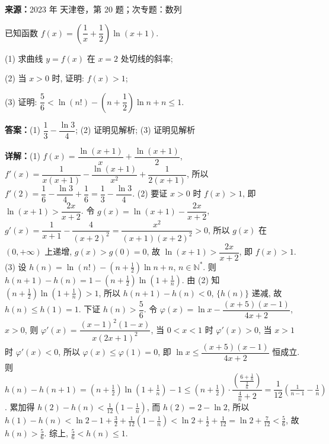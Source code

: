 \begin{question}[points=16]
\textbf{来源：}2023 年 天津卷，第 20 题；次专题：数列\par
已知函数 $f(x) = \left(\dfrac{1}{x} + \dfrac{1}{2}\right)\ln(x+1)$.

(1) 求曲线 $y = f(x)$ 在 $x = 2$ 处切线的斜率;

(2) 当 $x > 0$ 时, 证明: $f(x) > 1$;

(3) 证明: $\dfrac{5}{6} < \ln(n!) - \left(n+\dfrac{1}{2}\right)\ln n + n \le 1$.
\begin{solution}
\textbf{答案：}(1) $\dfrac{1}{3} - \dfrac{\ln 3}{4}$; (2) 证明见解析; (3) 证明见解析

\textbf{详解：}(1) $f(x) = \dfrac{\ln(x+1)}{x} + \dfrac{\ln(x+1)}{2}$, $f'(x) = \dfrac{1}{x(x+1)} - \dfrac{\ln(x+1)}{x^2} + \dfrac{1}{2(x+1)}$, 所以 $f'(2) = \dfrac{1}{6} - \dfrac{\ln3}{4} + \dfrac{1}{6} = \dfrac{1}{3} - \dfrac{\ln3}{4}$.
(2) 要证 $x>0$ 时 $f(x) > 1$, 即 $\ln(x+1) > \dfrac{2x}{x+2}$. 令 $g(x) = \ln(x+1) - \dfrac{2x}{x+2}$, $g'(x) = \dfrac{1}{x+1} - \dfrac{4}{(x+2)^2} = \dfrac{x^2}{(x+1)(x+2)^2} > 0$, 所以 $g(x)$ 在 $(0,+\infty)$ 上递增, $g(x) > g(0) = 0$, 故 $\ln(x+1) > \dfrac{2x}{x+2}$, 即 $f(x) > 1$.
(3) 设 $h(n) = \ln(n!) - \left(n+\frac{1}{2}\right)\ln n + n$, $n \in \mathbb{N}^*$. 则 $h(n+1)-h(n) = 1 - \left(n+\frac{1}{2}\right)\ln\left(1+\frac{1}{n}\right)$. 由 (2) 知 $\left(n+\frac{1}{2}\right)\ln\left(1+\frac{1}{n}\right) > 1$, 所以 $h(n+1)-h(n) < 0$, $\{h(n)\}$ 递减, 故 $h(n) \le h(1) = 1$. 下证 $h(n) > \dfrac{5}{6}$. 令 $\varphi(x) = \ln x - \dfrac{(x+5)(x-1)}{4x+2}$, $x>0$, 则 $\varphi'(x) = \dfrac{(x-1)^2(1-x)}{x(2x+1)^2}$, 当 $0<x<1$ 时 $\varphi'(x)>0$, 当 $x>1$ 时 $\varphi'(x)<0$, 所以 $\varphi(x) \le \varphi(1)=0$, 即 $\ln x \le \dfrac{(x+5)(x-1)}{4x+2}$ 恒成立. 则 $h(n)-h(n+1) = \left(n+\frac{1}{2}\right)\ln\left(1+\frac{1}{n}\right) - 1 \le \left(n+\frac{1}{2}\right) \cdot \dfrac{\left(\frac{6+\frac{1}{n}}{\frac{2}{n}}\right)}{\frac{4}{n}+2} = \dfrac{1}{12}\left(\frac{1}{n-1} - \frac{1}{n}\right)$. 累加得 $h(2)-h(n) < \frac{1}{12}\left(1-\frac{1}{n}\right)$, 而 $h(2) = 2-\ln2$, 所以 $h(1)-h(n) < \ln2 - 1 + \frac{3}{2} + \frac{1}{12}\left(1-\frac{1}{n}\right) < \ln2 + \frac{1}{2} + \frac{1}{12} = \ln2 + \frac{7}{12} < \frac{5}{6}$, 故 $h(n) > \frac{5}{6}$. 综上, $\frac{5}{6} < h(n) \le 1$.
\end{solution}
\end{question}

